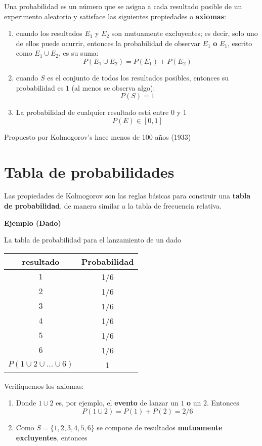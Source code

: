 \documentclass[
]{book}
\providecommand{\tightlist}{%
  \setlength{\itemsep}{0pt}\setlength{\parskip}{0pt}}
\begin{document}
Una probabilidad es un número que se asigna a cada resultado posible de un experimento aleatorio y satisface las siguientes propiedades o \textbf{axiomas}:

\begin{enumerate}
\def\labelenumi{\arabic{enumi})}
\tightlist
\item
  cuando los resultados \(E_1\) y \(E_2\) son mutuamente excluyentes; es decir, solo uno de ellos puede ocurrir, entonces la probabilidad de observar \(E_1\) \textbf{o} \(E_1\), escrito como \(E_1\cup E_2\), es su suma:
  \[P(E_1\cup E_2) = P(E_1) + P(E_2)\]
\item
  cuando \(S\) es el conjunto de todos los resultados posibles, entonces su probabilidad es \(1\) (al menos se observa algo): \[P(S)=1\]
\item
  La probabilidad de cualquier resultado está entre 0 y 1 \[P(E) \in [0,1]\]
\end{enumerate}

Propuesto por Kolmogorov's hace menos de 100 años (1933)

\hypertarget{tabla-de-probabilidades}{%
\section{Tabla de probabilidades}\label{tabla-de-probabilidades}}

Las propiedades de Kolmogorov son las reglas básicas para construir una \textbf{tabla de probabilidad}, de manera similar a la tabla de frecuencia relativa.

\textbf{Ejemplo (Dado)}

La tabla de probabilidad para el lanzamiento de un dado

\begin{longtable}[]{@{}cc@{}}
\toprule
resultado & Probabilidad \\
\midrule
\endhead
\(1\) & 1/6 \\
\(2\) & 1/6 \\
\(3\) & 1/6 \\
\(4\) & 1/6 \\
\(5\) & 1/6 \\
\(6\) & 1/6 \\
\(P(1 \cup 2\cup ... \cup 6)\) & 1 \\
\bottomrule
\end{longtable}

Verifiquemos los axiomas:

\begin{enumerate}
\def\labelenumi{\arabic{enumi})}
\item
  Donde \(1 \cup 2\) es, por ejemplo, el \textbf{evento} de lanzar un \(1\) \textbf{o} un \(2\). Entonces \[P(1 \cup 2)=P(1)+P(2)=2/6\]
\item
  Como \(S=\{1,2,3,4,5,6\}\) se compone de resultados \textbf{mutuamente excluyentes}, entonces
\end{enumerate}
\end{document}
